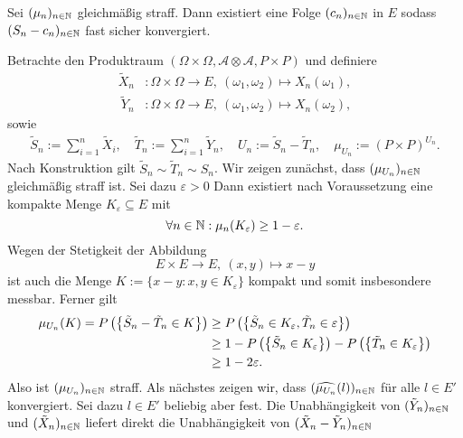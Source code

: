 \begin{theorem}
    Sei $(\mu_n)_{n \in \mathbb{N}}$ gleichmäßig straff. Dann existiert eine Folge $(c_n)_{n \in \mathbb{N}}$ in $E$ sodass $(S_n - c_n)_{n \in \mathbb{N}}$ fast sicher konvergiert.
\end{theorem}

\begin{proof*}
    Betrachte den Produktraum $(\Omega \times \Omega, \mathcal{A} \otimes \mathcal{A}, P \times P)$ und definiere 
    \begin{align*}
        \tilde{X}_n&: \Omega \times \Omega \to E, \ (\omega_1, \omega_2) \mapsto X_n(\omega_1), \\\
        \tilde{Y}_n&: \Omega \times \Omega \to E, \ (\omega_1, \omega_2) \mapsto X_n(\omega_2),
    \end{align*}
    sowie 
    \begin{align*}
        \tilde{S}_n := \sum_{i = 1}^n \tilde{X}_i, \quad \tilde{T}_n := \sum_{i = 1}^n \tilde{Y}_n, \quad U_n := \tilde{S}_n - \tilde{T}_n, \quad \mu_{U_n} := (P\times P)^{U_n}. 
    \end{align*}
    Nach Konstruktion gilt $\tilde{S}_n \sim \tilde{T}_n \sim S_n$. Wir zeigen zunächst, dass $(\mu_{U_n})_{n \in \mathbb{N}}$ gleichmäßig straff ist. 
    Sei dazu $\varepsilon > 0$ Dann existiert nach Voraussetzung eine kompakte Menge $K_{\varepsilon} \subseteq E$ mit 
    $$
        \forall n \in \mathbb{N}: \mu_n(K_{\varepsilon}) \geq 1 - \varepsilon. 
    $$
    Wegen der Stetigkeit der Abbildung 
    $$
        E \times E \to E, \ (x,y) \mapsto x - y
    $$
    ist auch die Menge $K := \{ x - y : x,y \in K_{\varepsilon} \}$ kompakt und somit insbesondere messbar. Ferner gilt
    \begin{align*}
        \mu_{U_n}(K) = P\left(\left\{ \tilde{S}_n - \tilde{T}_n \in K \right\}\right) &\geq P\left(\left\{ \tilde{S}_n \in K_{\varepsilon}, \tilde{T}_n \in \varepsilon \right\}\right) \\\
                                                              &\geq 1 - P\left(\left\{ \tilde{S}_n \in K_{\varepsilon} \right\}\right) - P\left(\left\{ \tilde{T}_n \in K_{\varepsilon} \right\}\right) \\\
                                                              &\geq 1 - 2 \varepsilon.                                              
    \end{align*}
    Also ist $(\mu_{U_n})_{n \in \mathbb{N}}$ straff. 
    Als nächstes zeigen wir, dass $(\widehat{\mu_{U_n}}(l))_{n \in \mathbb{N}}$ für alle $l \in E'$ konvergiert. Sei dazu $l \in E'$ beliebig aber fest. 
    Die Unabhängigkeit von $(\tilde{Y}_n)_{n \in \mathbb{N}}$ und $(\tilde{X}_n)_{n \in \mathbb{N}}$ liefert direkt die Unabhängigkeit von $(\tilde{X}_n - \tilde{Y}_n)_{n \in \mathbb{N}}$

\end{proof*}
